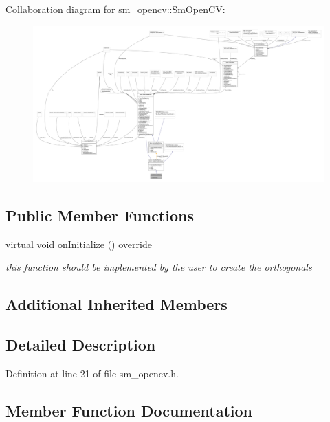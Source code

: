 Collaboration diagram for sm\+\_\+opencv\+:\+:Sm\+Open\+CV\+:
\nopagebreak
\begin{figure}[H]
\begin{center}
\leavevmode
\includegraphics[width=350pt]{structsm__opencv_1_1SmOpenCV__coll__graph}
\end{center}
\end{figure}
\subsection*{Public Member Functions}
\begin{DoxyCompactItemize}
\item 
virtual void \hyperlink{structsm__opencv_1_1SmOpenCV_ae32fcae433bed3e834b5860bb0046eb4}{on\+Initialize} () override
\begin{DoxyCompactList}\small\item\em this function should be implemented by the user to create the orthogonals \end{DoxyCompactList}\end{DoxyCompactItemize}
\subsection*{Additional Inherited Members}


\subsection{Detailed Description}


Definition at line 21 of file sm\+\_\+opencv.\+h.



\subsection{Member Function Documentation}
\mbox{\label{structsm__opencv_1_1SmOpenCV_ae32fcae433bed3e834b5860bb0046eb4}} 
